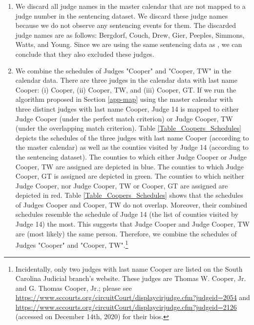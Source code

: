 \documentclass[11pt, oneside]{article}   	%
\theoremstyle{ModifiedStyle}
\begin{document}
    \begin{enumerate}
      \item We discard all judge names in the master calendar that are not mapped to a judge number in the sentencing dataset. We discard these judge names because we do not observe any sentencing events for them. The discarded judge names are as follows: Bergdorf, Couch, Drew, Gier, Peeples, Simmons, Watts, and Young. Since we are using the same sentencing data as \cite{hester2017conditional}, we can conclude that they also excluded these judges.
    	\item We combine the schedules of Judges "Cooper" and "Cooper, TW" in the calendar data. There are three judges in the calendar data with last name Cooper: (i) Cooper, (ii) Cooper, TW, and (iii) Cooper, GT. If we run the algorithm proposed in Section \ref{app-map} using the master calendar with three distinct judges with last name Cooper, Judge 14 is mapped to either Judge Cooper (under the perfect match criterion) or Judge Cooper, TW (under the overlapping match criterion). Table \ref{Table_Coopers_Schedules} depicts the schedules of the three judges with last name Cooper (according to the master calendar) as well as the counties visited by Judge 14 (according to the sentencing dataset). The counties to which either Judge Cooper or Judge Cooper, TW are assigned are depicted in blue. The counties to which Judge Cooper, GT is assigned are depicted in green. The counties to which neither Judge Cooper, nor Judge Cooper, TW or Cooper, GT are assigned are depicted in red. Table \ref{Table_Coopers_Schedules} shows that the schedules of Judges Cooper and Cooper, TW do not overlap. Moreover, their combined schedules resemble the schedule of Judge 14 (the list of counties visited by Judge 14) the most. This suggests that Judge Cooper and Judge Cooper, TW are (most likely) the same person. Therefore, we combine the schedules of Judges "Cooper" and "Cooper, TW".\footnote{Incidentally, only two judges with last name Cooper are listed on the South Carolina Judicial branch's website. These judges are Thomas W. Cooper, Jr. and G. Thomas Cooper, Jr.; please see \url{https://www.sccourts.org/circuitCourt/displaycirjudge.cfm?judgeid=2054} and \url{https://www.sccourts.org/circuitCourt/displaycirjudge.cfm?judgeid=2126} (accessed on December 14th, 2020) for their bios.}
    \end{enumerate}
\end{document}
